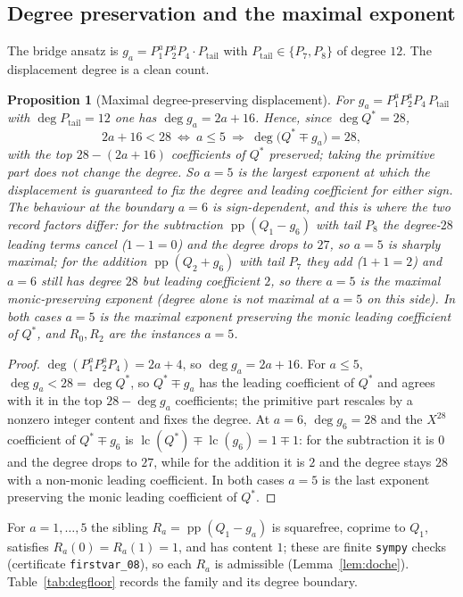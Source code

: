\documentclass[11pt,reqno]{amsart}
\theoremstyle{plain}
\newtheorem{proposition}[theorem]{Proposition}
\theoremstyle{definition}
\DeclareMathOperator{\pp}{pp}
\begin{document}
\subsection*{Degree preservation and the maximal exponent}
The bridge ansatz is $g_a=P_1^aP_2^aP_4\cdot P_{\mathrm{tail}}$ with
$P_{\mathrm{tail}}\in\{P_7,P_8\}$ of degree $12$. The displacement degree is a clean
count.

\begin{proposition}[Maximal degree-preserving displacement]\label{prop:degfloor}
For $g_a=P_1^aP_2^aP_4\,P_{\mathrm{tail}}$ with $\deg P_{\mathrm{tail}}=12$ one has
$\deg g_a=2a+16$. Hence, since $\deg Q^*=28$,
\[
  2a+16<28\ \Longleftrightarrow\ a\le5\ \Longrightarrow\ \deg\bigl(Q^*\mp g_a\bigr)=28 ,
\]
with the top $28-(2a+16)$ coefficients of $Q^*$ preserved; taking the primitive part does
not change the degree. So $a=5$ is the largest exponent at which the displacement is
guaranteed to fix the degree and leading coefficient \emph{for either sign}. The
behaviour at the boundary $a=6$ is sign-dependent, and this is where the two record
factors differ: for the subtraction $\pp(Q_1-g_6)$ with tail $P_8$ the degree-$28$
leading terms cancel ($1-1=0$) and the degree drops to $27$, so $a=5$ is sharply maximal;
for the addition $\pp(Q_2+g_6)$ with tail $P_7$ they add ($1+1=2$) and $a=6$ still has
degree $28$ but leading coefficient $2$, so there $a=5$ is the maximal
\emph{monic}-preserving exponent (degree alone is not maximal at $a=5$ on this side).
In both cases $a=5$ is the maximal exponent preserving the \emph{monic leading
coefficient} of $Q^*$, and $R_0,R_2$ are the instances $a=5$.
\end{proposition}

\begin{proof}
$\deg(P_1^aP_2^aP_4)=2a+4$, so $\deg g_a=2a+16$. For $a\le5$, $\deg g_a<28=\deg Q^*$, so
$Q^*\mp g_a$ has the leading coefficient of $Q^*$ and agrees with it in the top
$28-\deg g_a$ coefficients; the primitive part rescales by a nonzero integer content and
fixes the degree. At $a=6$, $\deg g_6=28$ and the $X^{28}$ coefficient of $Q^*\mp g_6$ is
$\operatorname{lc}(Q^*)\mp\operatorname{lc}(g_6)=1\mp1$: for the subtraction it is $0$ and
the degree drops to $27$, while for the addition it is $2$ and the degree stays $28$ with
a non-monic leading coefficient. In both cases $a=5$ is the last exponent preserving the
monic leading coefficient of $Q^*$.
\end{proof}

For $a=1,\dots,5$ the sibling $R_a=\pp(Q_1-g_a)$ is squarefree, coprime to $Q_1$,
satisfies $R_a(0)=R_a(1)=1$, and has content $1$; these are finite \texttt{sympy} checks
(certificate \texttt{firstvar\_08}), so each $R_a$ is admissible
(Lemma~\ref{lem:doche}). Table~\ref{tab:degfloor} records the family and its degree
boundary.
\end{document}
